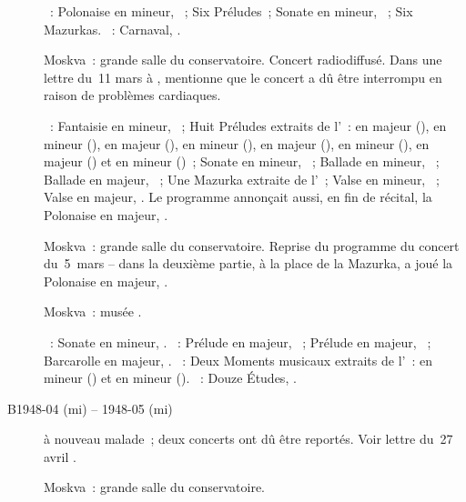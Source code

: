 \begin{description}
 \textsc{\Chopin{}}~: Polonaise en \kC \Sharp mineur,  ~;
 Six Préludes~; Sonate en \kB \Flat mineur, ~; Six Mazurkas.
 \textsc{\Schumann{}}~: Carnaval, .
 \item[\DateWithWeekDay{1948-03-05}]
 Moskva~: grande salle du conservatoire.
 Concert radiodiffusé.
 Dans une lettre du~11 mars à \AVizel{} \citep[voir][p.~168]{Nekrasova08},
 \VSofronitsky{} mentionne que le concert a dû être interrompu en raison de
 problèmes cardiaques.

 \textsc{\Chopin{}}~: Fantaisie en \kF mineur, ~; Huit Préludes
 extraits de l'~: en \kD \Flat majeur (), en \kB \Flat
 mineur (), en \kA \Flat majeur (), en \kF mineur
 (), en \kE \Flat majeur (), en \kC mineur
 (), en \kB \Flat majeur () et en \kG mineur
 ()~; Sonate en \kB \Flat mineur, ~; Ballade en \kF
 mineur, ~; Ballade en \kA \Flat majeur, ~; Une Mazurka
 extraite de l'~; Valse en \kC \Sharp mineur, 
 ~; Valse en \kD \Flat majeur,  .
 Le programme annonçait aussi, en fin de récital, la Polonaise en \kA \Flat
 majeur, .
 \item[\DateWithWeekDay{1948-03-26}]
 Moskva~: grande salle du conservatoire.
 Reprise du programme du concert \Chopin{} du~5~mars -- dans la deuxième
 partie, à la place de la Mazurka, \VSofronitsky{} a joué la Polonaise en
 \kA \Flat majeur, .
 \item[\DateWithWeekDay{1948-04-11}]
 Moskva~: musée \Scriabine{}.

 \textsc{\Glazounov{}}~: Sonate en \kB \Flat mineur, .
 \textsc{\Liadov{}}~: Prélude en \kD \Flat majeur,  ~;
 Prélude en \kF \Sharp majeur,  ~; Barcarolle en \kF
 \Sharp majeur, .
 \textsc{\Rachmaninov{}}~: Deux Moments musicaux extraits de l'~:
 en \kE mineur () et en \kE \Flat mineur ().
 \textsc{\Scriabine{}}~: Douze Études, .
 \item[B1948-04 (mi) -- 1948-05 (mi)]
 \VSofronitsky{} à nouveau malade~; deux concerts ont dû être reportés.
 Voir lettre du~27 avril \citep[p.~168]{Nekrasova08}.
 \item[\DateWithWeekDay{1948-05-19}]
 Moskva~: grande salle du conservatoire.


\end{description}
